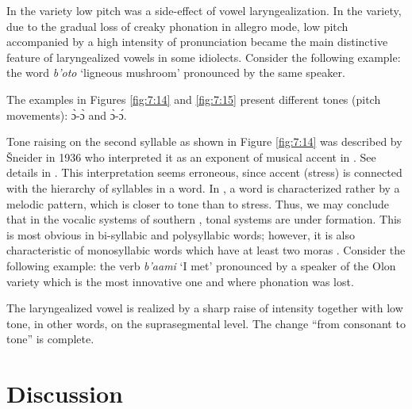 \documentclass[output=paper,colorlinks,citecolor=brown]{langscibook}
\begin{document}
In the  variety low pitch was a side-effect of vowel laryngealization. In the  variety, due to the gradual loss of creaky phonation in allegro mode, low pitch accompanied by a high intensity of pronunciation became the main distinctive feature of laryngealized vowels in some idiolects. Consider the following example: the word \textit{b’oto} ‘ligneous mushroom’ pronounced by the same speaker.



The examples in Figures \ref{fig:7:14} and \ref{fig:7:15} present different tones (pitch movements): ɔ̀-ɔ̀ and ɔ̀-ɔ́.

Tone raising on the second syllable as shown in Figure \ref{fig:7:14} was described by Šneider in 1936 who interpreted it as an exponent of musical accent in  \citep[92]{Shneider1936}. See details in \citet[134--137]{Nikolaeva2000}. This interpretation seems erroneous, since accent (stress) is connected with the hierarchy of syllables in a word. In , a word is characterized rather by a melodic pattern, which is closer to tone than to stress. Thus, we may conclude that in the vocalic systems of southern , tonal systems are under formation. This is most obvious in bi-syllabic and polysyllabic words; however, it is also characteristic of monosyllabic words which have at least two moras \citep{Simonov1988}. Consider the following example: the verb \textit{b’aami} ‘I met’ pronounced by a speaker of the Olon variety which is the most innovative one and where phonation was lost. 

The laryngealized vowel is realized by a sharp raise of intensity together with low tone, in other words, on the suprasegmental level. The change “from consonant to tone” is complete.


\section{Discussion}
\end{document}
